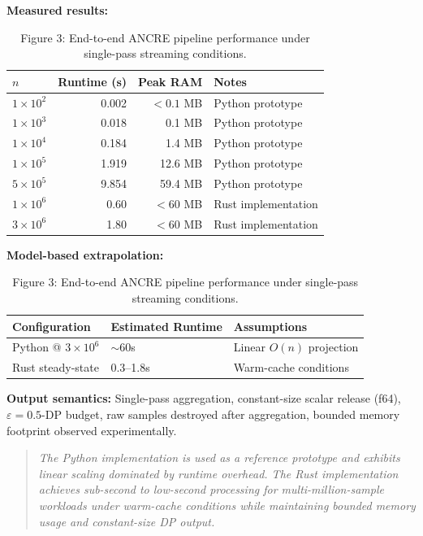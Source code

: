\begin{table}[h]
\centering
\caption{Figure 3: End-to-end ANCRE pipeline
performance under single-pass streaming conditions.}

\textbf{Measured results:}
\begin{tabular}{lrrl}
\toprule
$n$ & Runtime (s) & Peak RAM & Notes \\
\midrule
$1\times10^2$ & 0.002 & $<0.1$ MB & Python prototype \\
$1\times10^3$ & 0.018 & 0.1 MB    & Python prototype \\
$1\times10^4$ & 0.184 & 1.4 MB    & Python prototype \\
$1\times10^5$ & 1.919 & 12.6 MB   & Python prototype \\
$5\times10^5$ & 9.854 & 59.4 MB   & Python prototype \\
$1\times10^6$ & 0.60  & $<60$ MB  & Rust implementation \\
$3\times10^6$ & 1.80  & $<60$ MB  & Rust implementation \\
\bottomrule
\end{tabular}

\vspace{0.5em}
\textbf{Model-based extrapolation:}
\begin{tabular}{lll}
\toprule
Configuration & Estimated Runtime & Assumptions \\
\midrule
Python @ $3\times10^6$ & $\sim$60s & Linear $O(n)$ projection \\
Rust steady-state & 0.3–1.8s & Warm-cache conditions \\
\bottomrule
\end{tabular}

\vspace{0.5em}
\textbf{Output semantics:}
Single-pass aggregation, constant-size scalar
release (f64), $\varepsilon=0.5$-DP budget,
raw samples destroyed after aggregation,
bounded memory footprint observed experimentally.
\end{table}

\begin{quote}
\textit{The Python implementation is used as a
reference prototype and exhibits linear scaling
dominated by runtime overhead. The Rust
implementation achieves sub-second to low-second
processing for multi-million-sample workloads
under warm-cache conditions while maintaining
bounded memory usage and constant-size DP output.}
\end{quote}
